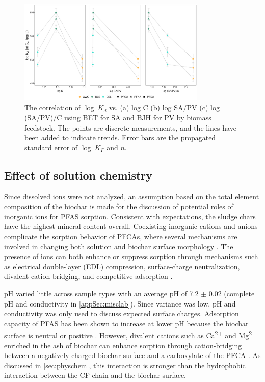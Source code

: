 \begin{figure}[htb]
    \centering
    \includegraphics[width=0.8\textwidth]{R/figs/SAPV_C_Kd1ugL_plot.pdf}
    \caption{The correlation of $\log~K_d$ vs. (a) log C (b) log SA/PV (c) log (SA/PV)/C using BET for SA and BJH for PV by biomass feedstock. The points are discrete measurements, and the lines have been added to indicate trends. Error bars are the propagated standard error of $\log~K_F$ and $n$.}
    \label{fig:Kd_SAPV_C}
\end{figure}

\subsection{Effect of solution chemistry}\label{sec:inorganic}
Since dissolved ions were not analyzed, an assumption based on the total element composition of the biochar is made for the discussion of potential roles of inorganic ions for PFAS sorption. Consistent with expectations, the sludge chars have the highest mineral content overall. Coexisting inorganic cations and anions complicate the sorption behavior of PFCAs, where several mechanisms are involved in changing both solution and biochar surface morphology \citep{du2014adsorption}. The presence of ions can both enhance or suppress sorption through mechanisms such as electrical double-layer (EDL) compression, surface-charge neutralization, divalent cation bridging, and competitive adsorption \citep{du2014adsorption}.

pH varied little across sample types with an average pH of 7.2 $\pm$ 0.02 (complete pH and conductivity in \cref{appSec:misclab}). Since variance was low, pH and conductivity was only used to discuss expected surface charges. Adsorption capacity of PFAS has been shown to increase at lower pH because the biochar surface is neutral or positive \citep{zhang2013sorption}. However, divalent cations such as Ca\textsuperscript{2+} and Mg\textsuperscript{2+} enriched in the ash of biochar can enhance sorption through cation-bridging between a negatively charged biochar surface and a carboxylate of the PFCA \citep{sigmund2022sorption}. As discussed in \cref{sec:physchem}, this interaction is stronger than the hydrophobic interaction between the CF-chain and the biochar surface. 

